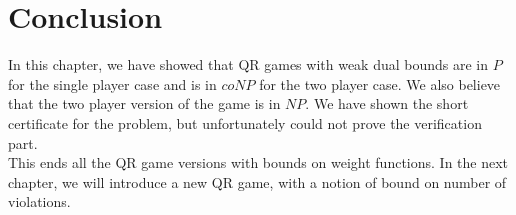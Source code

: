 \section{Conclusion}
In this chapter, we have showed that QR games with weak dual bounds are in $P$ for the single player case and is in $coNP$ for the two player case. We also believe that the two player version of the game is in $NP$. We have shown the short certificate for the problem, but unfortunately could not prove the verification part.\\
This ends all the QR game versions with bounds on weight functions. In the next chapter, we will introduce a new QR game, with a notion of bound on number of violations.